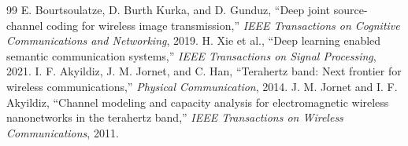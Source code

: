 \documentclass[sigconf]{acmart}
\begin{document}
\begin{thebibliography}{99}
 E. Bourtsoulatze, D. Burth Kurka, and D. Gunduz, ``Deep joint source-channel coding for wireless image transmission,'' \emph{IEEE Transactions on Cognitive Communications and Networking}, 2019.
 H. Xie et al., ``Deep learning enabled semantic communication systems,'' \emph{IEEE Transactions on Signal Processing}, 2021.
 I. F. Akyildiz, J. M. Jornet, and C. Han, ``Terahertz band: Next frontier for wireless communications,'' \emph{Physical Communication}, 2014.
 J. M. Jornet and I. F. Akyildiz, ``Channel modeling and capacity analysis for electromagnetic wireless nanonetworks in the terahertz band,'' \emph{IEEE Transactions on Wireless Communications}, 2011.
\end{thebibliography}
\end{document}
